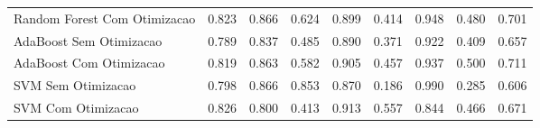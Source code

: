 \begin{table}[H]
\begin{adjustwidth}{ -1in }{ -1in }
\begin{tabular}{lrrrrrrrr}
      Random Forest Com Otimizacao &                        0.823 &                         0.866 &                            0.624 &                            0.899 &                          0.414 &                          0.948 &                                     0.480 &                                 0.701 \\
           AdaBoost Sem Otimizacao &                        0.789 &                         0.837 &                            0.485 &                            0.890 &                          0.371 &                          0.922 &                                     0.409 &                                 0.657 \\
           AdaBoost Com Otimizacao &                        0.819 &                         0.863 &                            0.582 &                            0.905 &                          0.457 &                          0.937 &                                     0.500 &                                 0.711 \\
                SVM Sem Otimizacao &                        0.798 &                         0.866 &                            0.853 &                            0.870 &                          0.186 &                          0.990 &                                     0.285 &                                 0.606 \\
                SVM Com Otimizacao &                        0.826 &                         0.800 &                            0.413 &                            0.913 &                          0.557 &                          0.844 &                                     0.466 &                                 0.671 \\
\bottomrule
\end{tabular}
    \end{adjustwidth}
    \renewcommand{\arraystretch}{1.0} %
\end{table}
